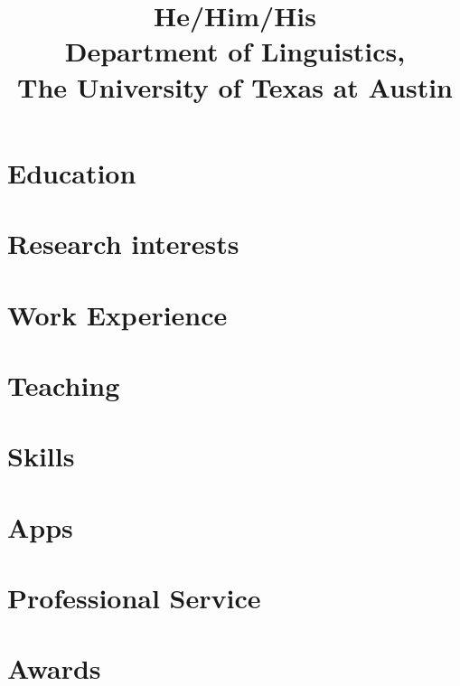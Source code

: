 \documentclass[11pt,a4paper]{mycv}
\title{He/Him/His\\Department of Linguistics,\\The University of Texas at Austin}
\begin{document}
\makecvtitle


\section{Education}


\vspace{0.5mm}

\section{Research interests}


\section{Work Experience}


\begingroup
\setlength\bibitemsep{0.5ex}
\printbibliography[title=Papers, nottype=unpublished]
\endgroup

\begingroup
\setlength\bibitemsep{0.5ex}
\printbibliography[title=Talks, type=unpublished]
\endgroup

\section{Teaching}


\section{Skills}


\section{Apps}


\section{Professional Service}


\section{Awards}

\end{document}

